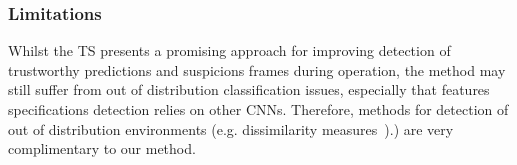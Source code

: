\subsubsection{Limitations}
Whilst the TS presents a promising approach for improving detection of trustworthy predictions and suspicions frames during operation, the method may still suffer from out of distribution classification issues, especially that features specifications detection relies on other CNNs.
Therefore, methods for detection of out of distribution environments (e.g. dissimilarity measures~\cite{Hond2020}).) are very complimentary to our method.




